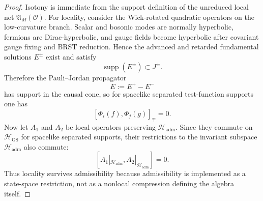 \documentclass[11pt,a4paper]{article}
\theoremstyle{definition}
\theoremstyle{remark}
\begin{document}
\begin{proof}
Isotony is immediate from the support definition of the unreduced local net
$\mathfrak A_M(\mathcal O)$. For locality, consider the Wick-rotated quadratic operators on the
low-curvature branch. Scalar and bosonic modes are normally hyperbolic, fermions are
Dirac-hyperbolic, and gauge fields become hyperbolic after covariant gauge fixing and BRST
reduction. Hence the advanced and retarded fundamental solutions $E^\pm$ exist and satisfy
\[
\operatorname{supp}(E^\pm)\subset J^\pm.
\]
Therefore the Pauli--Jordan propagator
\[
E:=E^+-E^-
\]
has support in the causal cone, so for spacelike separated test-function supports one has
\[
[\Phi_i(f),\Phi_j(g)]_{\mp}=0.
\]
Now let $A_1$ and $A_2$ be local operators preserving $\mathcal H_{\mathrm{adm}}$. Since they
commute on $\mathcal H_{\mathrm{OS}}$ for spacelike separated supports, their restrictions to the
invariant subspace $\mathcal H_{\mathrm{adm}}$ also commute:
\[
[A_1|_{\mathcal H_{\mathrm{adm}}},A_2|_{\mathcal H_{\mathrm{adm}}}]=0.
\]
Thus locality survives admissibility because admissibility is implemented as a state-space
restriction, not as a nonlocal compression defining the algebra itself.
\end{proof}
\end{document}
